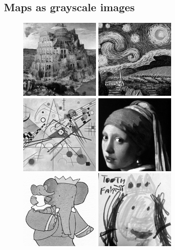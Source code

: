 \documentclass[letterpaper, 10pt, conference]{ieeeconf}
\begin{document}
\subsection{Maps as grayscale images}

\begin{figure}
\includegraphics[width=.15\textwidth]{maps/breugel_babel} \hfill
\includegraphics[width=.15\textwidth]{maps/van-gogh_starry-night} \hfill
\includegraphics[width=.15\textwidth]{maps/kandinsky_comp-8} \hfill
\includegraphics[width=.15\textwidth]{maps/vermeer_girl-pearl} \hfill
\includegraphics[width=.15\textwidth]{maps/babar} \hfill
\includegraphics[width=.15\textwidth]{maps/childs-drawing_tooth-fairy}

\hfill
{}\hfill
{}\hfill
{}\hfill
{}\hfill
{}


\end{figure}
\end{document}
